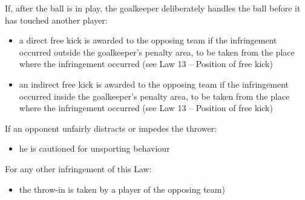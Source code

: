 {{\bigskip

If, after the ball is in play, the goalkeeper deliberately handles the
ball before it has touched another player:

\begin{itemize}
\item a direct free kick is awarded to the opposing team if the infringement
occurred outside the goalkeeper's penalty area, to be
taken from the place where the infringement occurred (see Law 13 --
Position of free kick)
\item an indirect free kick is awarded to the opposing team if the
infringement occurred inside the goalkeeper's penalty
area, to be taken from the place where the infringement occurred (see
Law 13 -- Position of free kick)
\end{itemize}

\bigskip

If an opponent unfairly distracts or impedes the thrower:

\begin{itemize}
\item he is cautioned for unsporting behaviour
\end{itemize}

\bigskip

For any other infringement of this Law:

\begin{itemize}
\item the throw-in is taken by a player of the opposing team)
\end{itemize}
}
}
